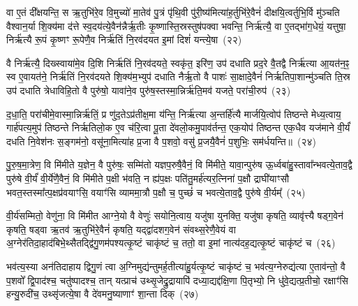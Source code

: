 वा ए॒तं दी᳚क्षयन्ति॒ स ऋ॒तुभि॑रे॒व वि॒मुच्यो॑ मा॒तेव॑ पु॒त्रं पृ॑थि॒वी पु॑री॒ष्य॑मित्या॑ह॒र्तुभि॑रे॒वैनं॑ दीक्षयि॒त्वर्तुभि॒र्वि मु॑ञ्चति वैश्वान॒र्या शि॒क्य॑मा द॑त्ते स्व॒दय॑त्ये॒वैन॑न्नैर्\mbox{}ऋ॒तीः कृ॒ष्णास्ति॒स्रस्तुष॑पक्वा भवन्ति॒ निर्\mbox{}ऋ॑त्यै॒ वा ए॒तद्भा॑ग॒धेयं॒ यत्तुषा॒ निर्\mbox{}ऋ॑त्यै रू॒पं कृ॒ष्णꣳ रू॒पेणै॒व निर्\mbox{}ऋ॑तिं नि॒रव॑दयत इ॒मां दिशं॑ यन्त्ये॒षा~(२२)

वै निर्\mbox{}ऋ॑त्यै॒ दिख्स्वाया॑मे॒व दि॒शि निर्\mbox{}ऋ॑तिं नि॒रव॑दयते॒ स्वकृ॑त॒ इरि॑ण॒ उप॑ दधाति प्रद॒रे वै॒तद्वै निर्\mbox{}ऋ॑त्या आ॒यत॑न॒ꣴ॒ स्व ए॒वायत॑ने॒ निर्\mbox{}ऋ॑तिं नि॒रव॑दयते शि॒क्य॑म॒भ्युप॑ दधाति नैर्\mbox{}ऋ॒तो वै पाशः॑ सा॒क्षादे॒वैनं॑ निर्\mbox{}ऋतिपा॒शान्मु॑ञ्चति ति॒स्र उप॑ दधाति त्रेधाविहि॒तो वै पुरु॑षो॒ यावा॑ने॒व पुरु॑ष॒स्तस्मा॒न्निर्\mbox{}ऋ॑ति॒मव॑ यजते॒ परा॑ची॒रुप॑~(२३)

द॒धा॒ति॒ परा॑चीमे॒वास्मा॒न्निर्\mbox{}ऋ॑तिं॒ प्र णु॑द॒ते\-ऽप्र॑तीक्ष॒मा य॑न्ति॒ निर्\mbox{}ऋ॑त्या अ॒न्तर्\mbox{}हि॑त्यै मार्जयि॒त्वोप॑ तिष्ठन्ते मेध्य॒त्वाय॒ गार्\mbox{}ह॑पत्य॒मुप॑ तिष्ठन्ते निर्\mbox{}ऋतिलो॒क ए॒व च॑रि॒त्वा पू॒ता दे॑वलो॒कमु॒पाव॑र्तन्त॒ एक॒योप॑ तिष्ठन्त एक॒धैव यज॑माने वी॒र्यं॑ दधति नि॒वेश॑नः स॒ङ्गम॑नो॒ वसू॑ना॒मित्या॑ह प्र॒जा वै प॒शवो॒ वसु॑ प्र॒जयै॒वैनं॑ प॒शुभिः॒ सम॑र्धयन्ति॥~(२४)

{\anuvakamend[{ऋ॒तुभि॑रे॒षा परा॑ची॒रुपा॒ष्टाच॑त्वारिꣳशच्च}]}%

पु॒रु॒ष॒मा॒त्रेण॒ वि मि॑मीते य॒ज्ञेन॒ वै पुरु॑षः॒ सम्मि॑तो यज्ञप॒रुषै॒वैनं॒ वि मि॑मीते॒ यावा॒न्पुरु॑ष ऊ॒र्ध्वबा॑हु॒स्तावा᳚न्भव\-त्ये॒ताव॒द्वै पुरु॑षे वी॒र्यं॑ वी॒र्ये॑णै॒वैनं॒ वि मि॑मीते प॒क्षी भ॑वति॒ न ह्य॑प॒क्षः पति॑तु॒मर्\mbox{}ह॑त्यर॒त्निना॑ प॒क्षौ द्राघी॑याꣳसौ भवत॒स्तस्मा᳚त्प॒क्षप्र॑वयाꣳसि॒ वयाꣳ॑सि व्याममा॒त्रौ प॒क्षौ च॒ पुच्छं॑ च भवत्ये॒ताव॒द्वै पुरु॑षे वी॒र्यम्᳚~(२५)

वी॒र्य॑सम्मितो॒ वेणु॑ना॒ वि मि॑मीत आग्ने॒यो वै वेणुः॑ सयोनि॒त्वाय॒ यजु॑षा युनक्ति॒ यजु॑षा कृषति॒ व्यावृ॑त्त्यै षड्ग॒वेन॑ कृषति॒ षड्वा ऋ॒तव॑ ऋ॒तुभि॑रे॒वैनं॑ कृषति॒ यद्द्वा॑दशग॒वेन॑ संवथ्स॒रेणै॒वेयं वा अ॒ग्नेर॑तिदा॒हाद॑बिभे॒थ्सैतद्द्वि॑गु॒णम॑पश्यत्कृ॒ष्टं चाकृ॑ष्टं च॒ ततो॒ वा इ॒मां नात्य॑दह॒द्यत्कृ॒ष्टं चाकृ॑ष्टं च~(२६)

भव॑त्य॒स्या अन॑तिदाहाय द्विगु॒णं त्वा अ॒ग्निमुद्य॑न्तुमर्\mbox{}ह॒तीत्या॑हु॒र्यत्कृ॒ष्टं चाकृ॑ष्टं च॒ भव॑त्य॒ग्नेरुद्य॑त्या ए॒ताव॑न्तो॒ वै प॒शवो᳚ द्वि॒पाद॑श्च॒ चतु॑ष्पादश्च॒ तान् यत्प्राच॑ उथ्सृ॒जेद्रु॒द्रायापि॑ दध्या॒द्यद्द॑क्षि॒णा पि॒तृभ्यो॒ नि धु॑वे॒द्यत्प्र॒तीचो॒ रक्षाꣳ॑सि हन्यु॒रुदी॑च॒ उथ्सृ॑जत्ये॒षा वै दे॑वमनु॒ष्याणाꣳ॑ शा॒न्ता दिक्~(२७)

